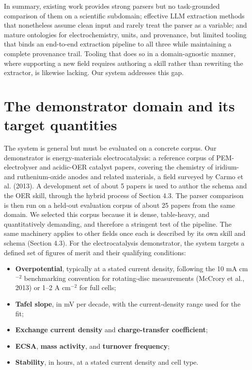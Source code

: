 \documentclass{template}
\begin{document}
In summary, existing work provides strong parsers but no task-grounded comparison of them on a scientific subdomain; effective LLM extraction methods that nonetheless assume clean input and rarely treat the parser as a variable; and mature ontologies for electrochemistry, units, and provenance, but limited tooling that binds an end-to-end extraction pipeline to all three while maintaining a complete provenance trail. Tooling that does so in a domain-agnostic manner, where supporting a new field requires authoring a skill rather than rewriting the extractor, is likewise lacking. Our system addresses this gap.


\section{The demonstrator domain and its target quantities}

The system is general but must be evaluated on a concrete corpus. Our demonstrator is energy-materials electrocatalysis: a reference corpus of PEM-electrolyser and acidic-OER catalyst papers, covering the chemistry of iridium- and ruthenium-oxide anodes and related materials, a field surveyed by Carmo et al. (2013). A development set of about 5 papers is used to author the schema and the OER skill, through the hybrid process of Section 4.3. The parser comparison is then run on a held-out evaluation corpus of about 25 papers from the same domain. We selected this corpus because it is dense, table-heavy, and quantitatively demanding, and therefore a stringent test of the pipeline. The same machinery applies to other fields once each is described by its own skill and schema (Section 4.3). For the electrocatalysis demonstrator, the system targets a defined set of figures of merit and their qualifying conditions:

\begin{itemize}
\item \textbf{Overpotential}, typically at a stated current density, following the 10 mA cm$^{-2}$ benchmarking convention for rotating-disc measurements (McCrory et al., 2013) or 1--2 A cm$^{-2}$ for full cells;
\item \textbf{Tafel slope}, in mV per decade, with the current-density range used for the fit;
\item \textbf{Exchange current density} and \textbf{charge-transfer coefficient};
\item \textbf{ECSA}, \textbf{mass activity}, and \textbf{turnover frequency};
\item \textbf{Stability}, in hours, at a stated current density and cell type.
\end{itemize}
\end{document}
